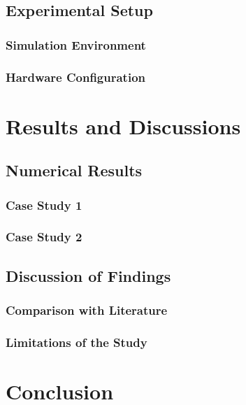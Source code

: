 	\subsection{Experimental Setup}
		\subsubsection{Simulation Environment}
		\subsubsection{Hardware Configuration}

\section{Results and Discussions}
\lipsum[1]
	\subsection{Numerical Results}
	\lipsum[1]
		\subsubsection{Case Study 1}
		\lipsum[1]
		\subsubsection{Case Study 2}
		\lipsum[1]

\subsection{Discussion of Findings}
\lipsum[1]
	\subsubsection{Comparison with Literature}
	\lipsum[1]
	\subsubsection{Limitations of the Study}
	\lipsum[1]

\section{Conclusion }
\lipsum[1-3]
